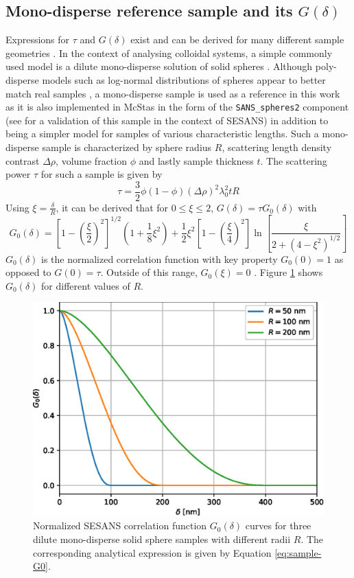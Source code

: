 \documentclass{article}
\begin{document}
\subsection{Mono-disperse reference sample and its $G(\delta)$}
\label{c2.4}
Expressions for $\tau$ and $G(\delta)$ exist and can be derived for many different sample geometries \cite{andersson2008}. In the context of analysing colloidal systems, a simple commonly used model is a dilute mono-disperse solution of solid spheres \cite{tromp2007}. Although poly-disperse models such as log-normal distributions of spheres appear to better match real samples \cite{heijkamp2011}, a mono-disperse sample is used as a reference in this work as it is also implemented in McStas in the form of the \texttt{SANS\_spheres2} component (see \cite{parnell2024} for a validation of this sample in the context of SESANS) in addition to being a simpler model for samples of various characteristic lengths. Such a mono-disperse sample is characterized by sphere radius $R$, scattering length density contrast $\Delta\rho$, volume fraction $\phi$ and lastly sample thickness $t$. The scattering power $\tau$ for such a sample is given by
\begin{equation}
	\tau = \frac{3}{2}\phi (1 - \phi) (\Delta\rho)^2\lambda_0^2tR \label{eq:sample-tau}
\end{equation}
Using $\xi = \frac{\delta}{R}$, it can be derived that for $0\leq \xi \leq 2$, $G(\delta) = \tau G_0(\delta)$ with 
\begin{equation}
	G_0(\delta) = \left[1 - \left(\frac{\xi}{2}\right)^2\right]^{1/2}\left(1 + \frac{1}{8}\xi^2\right) + \frac{1}{2}\xi^2\left[1 - \left(\frac{\xi}{4}\right)^2\right]\ln \left[\frac{\xi}{2 + (4 - \xi^2)^{1/2}}\right] \label{eq:sample-G0}
\end{equation}
$G_0(\delta)$ is the normalized correlation function with key property $G_0(0) = 1$ as opposed to $G(0) = \tau$. Outside of this range, $G_0(\xi) = 0$ \cite{krouglov2003}. Figure \ref{fig:analytical-G0} shows $G_0(\delta)$ for different values of $R$. 

\begin{figure}
	\centering
	\includegraphics[width=0.5\linewidth]{analytical-G0}
	\caption{Normalized SESANS correlation function $G_0(\delta)$ curves for three dilute mono-disperse solid sphere samples with different radii $R$. The corresponding analytical expression is given by Equation \eqref{eq:sample-G0}.}
	\label{fig:analytical-G0}
\end{figure}
\end{document}
